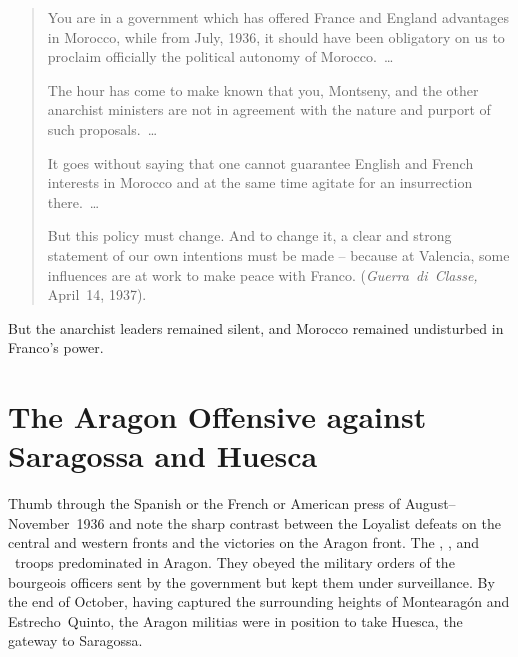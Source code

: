 \indexCNT{}
\begin{quotation}
  You are in a government which has offered France and England advantages in Morocco, while from July, 1936, it should have been obligatory on us to proclaim officially the political autonomy of Morocco.\ \dots
  
  The hour has come to make known that you, Montseny, and the other anarchist ministers are not in agreement with the nature and purport of such proposals.\ \dots
  
  It goes without saying that one cannot guarantee English and French interests in Morocco and at the same time agitate for an insurrection there.\ \dots
  
  But this policy must change. And to change it, a clear and strong statement of our own intentions must be made -- because at Valencia, some influences are at work to make peace with Franco. (\emph{Guerra~di~Classe,} April~14, 1937). 
\end{quotation}

But the anarchist leaders remained silent, and Morocco remained undisturbed in Franco’s power.%

\section{The Aragon Offensive against Saragossa and Huesca}

Thumb through the Spanish or the French or American press of August--November~1936 and note the sharp contrast between the Loyalist defeats on the central and western fronts and the victories on the Aragon front. The \CNT, \FAI, and \POUM\ troops predominated in Aragon. They obeyed the military orders of the bourgeois officers sent by the government but kept them under surveillance. By the end of October, having captured the surrounding heights of Montearagón and Estrecho~Quinto, the Aragon militias were in position to take Huesca, the gateway to Saragossa.